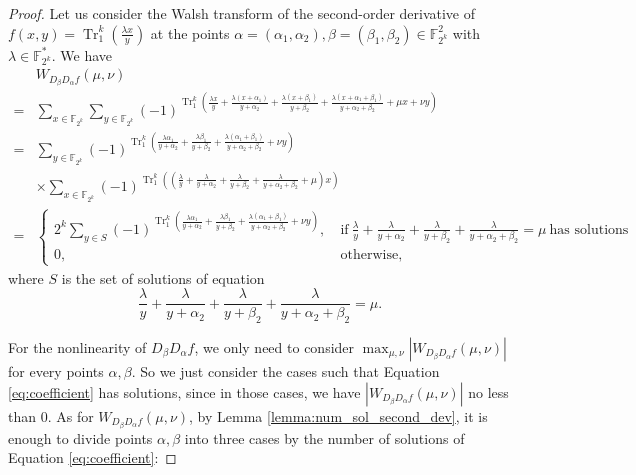 \documentclass{article}
\newcommand{\F}{\mathbb{F}}
\newcommand{\0}{\textbf{0}}
\newcommand{\1}{\textbf{1}}
\newcommand{\TRACE}{\operatorname{Tr}_1^k}
\theoremstyle{plain}
\begin{document}
    \begin{proof}        
        Let us consider the Walsh transform of the second-order derivative of $f(x,y)=\TRACE\left(\frac{\lambda x}{y}\right)$ at the points $\alpha=(\alpha_1,\alpha_2),\beta=(\beta_1,\beta_2)\in\F_{2^k}^2$ with $\lambda\in\F_{2^k}^*$. 
        We have 
        \begin{align*}\label{eq:secondordersum}
            &W_{D_{\beta}D_{\alpha}f}(\mu,\nu)\nonumber\\
            =&\sum_{x\in\F_{2^k}}\sum_{y\in\F_{2^k}}(-1)^{\TRACE\left(\frac{\lambda x}{y}+\frac{\lambda (x+\alpha_1)}{y+\alpha_2}+\frac{\lambda (x+\beta_1)}{y+\beta_2}+\frac{\lambda (x+\alpha_1+\beta_1)}{y+\alpha_2+\beta_2}+\mu x+\nu y\right)}\nonumber\\
            =&\sum_{y\in\F_{2^k}}(-1)^{\TRACE\left(\frac{\lambda\alpha_1}{y+\alpha_2}+\frac{\lambda\beta_1}{y+\beta_2}+\frac{\lambda(\alpha_1+\beta_1)}{y+\alpha_2+\beta_2}+\nu y\right)}\nonumber\\
            &\times \sum_{x\in\F_{2^k}}(-1)^{\TRACE\left(\left(\frac{\lambda}{y}+\frac{\lambda}{y+\alpha_2}+\frac{\lambda}{y+\beta_2}+\frac{\lambda}{y+\alpha_2+\beta_2}+\mu\right)x\right)}\nonumber\\
            =&\begin{cases}
                2^k\sum_{y\in S}(-1)^{\TRACE\left(\frac{\lambda\alpha_1}{y+\alpha_2}+\frac{\lambda\beta_1}{y+\beta_2}+\frac{\lambda(\alpha_1+\beta_1)}{y+\alpha_2+\beta_2}+\nu y\right)},&~\text{if}~\frac{\lambda}{y}+\frac{\lambda}{y+\alpha_2}+\frac{\lambda}{y+\beta_2}+\frac{\lambda}{y+\alpha_2+\beta_2}=\mu~\text{has solutions}\\
                0, &~\text{otherwise}, 
            \end{cases}
        \end{align*}
        where $S$ is the set of solutions of equation 
        \begin{equation}\label{eq:coefficient}
            \frac{\lambda}{y}+\frac{\lambda}{y+\alpha_2}+\frac{\lambda}{y+\beta_2}+\frac{\lambda}{y+\alpha_2+\beta_2}=\mu.
        \end{equation}

        For the nonlinearity of $D_{\beta}D_{\alpha}f$, we only need to consider $\max_{\mu,\nu}|W_{D_{\beta}D_{\alpha}f}(\mu,\nu)|$ for every points $\alpha,\beta$. 
        So we just consider the cases such that Equation \eqref{eq:coefficient} has solutions, since in those cases, we have $\left\lvert W_{D_{\beta}D_{\alpha}f}(\mu,\nu)\right\rvert$ no less than $0$.  
        As for $W_{D_{\beta}D_{\alpha}f}(\mu,\nu)$, by Lemma \ref{lemma:num_sol_second_dev}, it is enough to divide points $\alpha,\beta$ into three cases by the number of solutions 
        of Equation \eqref{eq:coefficient}: 


\end{proof}
\end{document}
